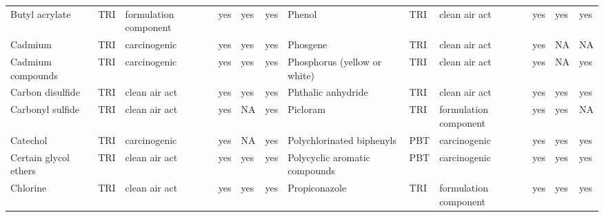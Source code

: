 \begin{table}[H]
{\begin{tabular}{llllllllllll}
            Butyl acrylate                                                             & TRI            & formulation component & yes    & yes     & yes  & Phenol                                                                                                             & TRI            & clean air act         & yes & yes & yes\\
            Cadmium                                                                    & TRI            & carcinogenic          & yes    & yes     & yes  & Phosgene                                                                                                           & TRI            & clean air act         & yes    & NA      & NA   \\
            Cadmium compounds                                                          & TRI            & carcinogenic          & yes    & yes     & yes  & Phosphorus (yellow or white)                                                                                       & TRI            & clean air act & yes & NA & yes\\
            Carbon disulfide                                                           & TRI            & clean air act         & yes    & yes     & yes  & Phthalic anhydride                                                                                                 & TRI            & clean air act & yes & yes & yes\\
            Carbonyl sulfide                                                           & TRI            & clean air act         & yes    & NA      & yes  & Picloram                                                                                                           & TRI            & formulation component & yes & yes & NA\\
            Catechol                                                                   & TRI            & carcinogenic          & yes    & NA      & yes  & Polychlorinated biphenyls                                                                                          & PBT            & carcinogenic          & yes & yes & yes\\
            Certain glycol ethers                                                      & TRI            & clean air act         & yes    & yes     & yes  & Polycyclic aromatic compounds & PBT & carcinogenic & yes & yes & yes\\
            Chlorine                                                                   & TRI            & clean air act         & yes    & yes     & yes  & Propiconazole                                                                                                      & TRI            & formulation component & yes & yes & yes\\

\end{tabular}}
\end{table}
